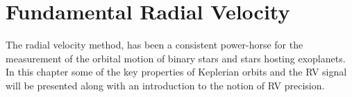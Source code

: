 
\chapter{Fundamental Radial Velocity}
\label{cha:rv_concepts}

The radial velocity method, has been a consistent power-horse for the measurement of the orbital motion of binary stars and stars hosting exoplanets.
In this chapter some of the key properties of Keplerian orbits and the RV signal will be presented along with an introduction to the notion of RV precision.




